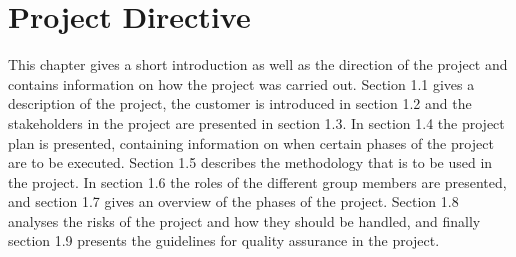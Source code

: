 \chapter{Project Directive}

This chapter gives a short introduction as well as the direction of the project and contains information 
on how the project was carried out. Section 1.1 gives a description of the project, the customer is 
introduced in section 1.2 and the stakeholders in the project are presented in section 1.3. In section 
1.4 the project plan is presented, containing information on when certain phases of the project are to be 
executed. Section 1.5 describes the methodology that is to be used in the project. In section 1.6 the roles 
of the different group members are presented, and section 1.7 gives an overview of the phases of the project. 
Section 1.8 analyses the risks of the project and how they should be handled, and finally section 1.9 
presents the guidelines for quality assurance in the project.